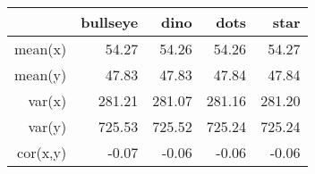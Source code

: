 \begin{tabular}{rrrrr}
  \toprule
  & bullseye & dino & dots & star \\ 
  \midrule
  mean(x) & 54.27 & 54.26 & 54.26 & 54.27 \\ 
  mean(y) & 47.83 & 47.83 & 47.84 & 47.84 \\ 
  var(x) & 281.21 & 281.07 & 281.16 & 281.20 \\ 
  var(y) & 725.53 & 725.52 & 725.24 & 725.24 \\ 
  cor(x,y) & -0.07 & -0.06 & -0.06 & -0.06 \\ 
   \bottomrule
\end{tabular}
